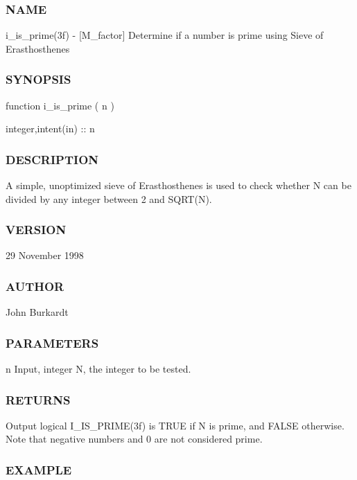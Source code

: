 \subsubsection*{N\+A\+ME}

i\+\_\+is\+\_\+prime(3f) -\/ \mbox{[}M\+\_\+factor\mbox{]} Determine if a number is prime using Sieve of Erasthosthenes \subsubsection*{S\+Y\+N\+O\+P\+S\+IS}

function i\+\_\+is\+\_\+prime ( n )

integer,intent(in) \+:\+: n

\subsubsection*{D\+E\+S\+C\+R\+I\+P\+T\+I\+ON}

A simple, unoptimized sieve of Erasthosthenes is used to check whether N can be divided by any integer between 2 and S\+Q\+R\+T(\+N).

\subsubsection*{V\+E\+R\+S\+I\+ON}

29 November 1998

\subsubsection*{A\+U\+T\+H\+OR}

John Burkardt

\subsubsection*{P\+A\+R\+A\+M\+E\+T\+E\+RS}

n Input, integer N, the integer to be tested. \subsubsection*{R\+E\+T\+U\+R\+NS}

Output logical I\+\_\+\+I\+S\+\_\+\+P\+R\+I\+M\+E(3f) is T\+R\+UE if N is prime, and F\+A\+L\+SE otherwise. Note that negative numbers and 0 are not considered prime. \subsubsection*{E\+X\+A\+M\+P\+LE}

